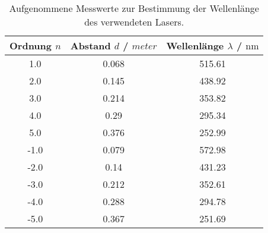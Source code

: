 \begin{table}
\centering
\begin{tabular}{ccc}
\toprule
Ordnung $n$ & Abstand $d$ / $\si{meter}$ & Wellenlänge $\lambda$ / $\si{\nano\meter}$ \\
\midrule
1.0 & 0.068 & 515.61 \\
2.0 & 0.145 & 438.92 \\
3.0 & 0.214 & 353.82 \\
4.0 & 0.29 & 295.34 \\
5.0 & 0.376 & 252.99 \\
-1.0 & 0.079 & 572.98 \\
-2.0 & 0.14 & 431.23 \\
-3.0 & 0.212 & 352.61 \\
-4.0 & 0.288 & 294.78 \\
-5.0 & 0.367 & 251.69 \\
\bottomrule
\end{tabular}
\caption{Aufgenommene Messwerte zur Bestimmung der Wellenlänge des verwendeten Lasers.}
\label{tab:welle}
\end{table}
